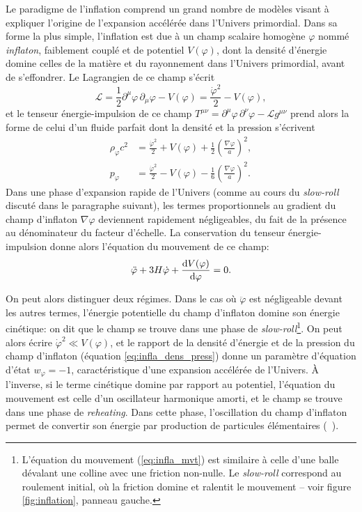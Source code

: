 Le paradigme de l'inflation comprend un grand nombre de modèles visant à expliquer l'origine de l'expansion accélérée dans l'Univers primordial.
Dans sa forme la plus simple, l'inflation est due à un champ scalaire homogène $\varphi$ nommé \textit{inflaton}, faiblement couplé et de potentiel $V(\varphi)$, dont la densité d'énergie domine celles de la matière et du rayonnement dans l'Univers primordial, avant de s'effondrer.
Le Lagrangien de ce champ s'écrit
\begin{equation}
    \mathcal{L} = \frac{1}{2} \partial^\mu\varphi \, \partial_\mu\varphi - V(\varphi) = \frac{\dot{\varphi}^2}{2} - V(\varphi),
\end{equation}
et le tenseur énergie-impulsion de ce champ $T^{\mu\nu} = \partial^\mu\varphi \, \partial^\nu\varphi - \mathcal{L}g^{\mu\nu}$ prend alors la forme de celui d'un fluide parfait dont la densité et la pression s'écrivent
\begin{align}
    \label{eq:infla_dens_press}
    \nonumber \rho_\varphi c^2 &= \frac{\dot{\varphi}^2}{2} + V(\varphi)
    + \frac{1}{2}\left(\frac{\nabla\varphi}{a}\right)^2, \\
    p_\varphi &= \frac{\dot{\varphi}^2}{2} - V(\varphi)
    - \frac{1}{6}\left(\frac{\nabla\varphi}{a}\right)^2.
\end{align}
Dans une phase d'expansion rapide de l'Univers (comme au cours du \textit{slow-roll} discuté dans le paragraphe suivant), les termes proportionnels au gradient du champ d'inflaton $\nabla\varphi$ deviennent rapidement négligeables, du fait de la présence au dénominateur du facteur d'échelle.
La conservation du tenseur énergie-impulsion donne alors l'équation du mouvement de ce champ:
\begin{equation}
    \label{eq:infla_mvt}
    \ddot{\varphi} + 3H\dot{\varphi} + \frac{\mathrm{d} V(\varphi)}{\mathrm{d}\varphi} = 0.
\end{equation}

On peut alors distinguer deux régimes.
Dans le cas où $\ddot{\varphi}$ est négligeable devant les autres termes, l'énergie potentielle du champ d'inflaton domine son énergie cinétique: on dit que le champ se trouve dans une phase de \textit{slow-roll}\footnote{L'équation du mouvement (\ref{eq:infla_mvt}) est similaire à celle d'une balle dévalant une colline avec une friction non-nulle. Le \textit{slow-roll} correspond au roulement initial, où la friction domine et ralentit le mouvement -- voir figure \ref{fig:inflation}, panneau gauche.}.
On peut alors écrire $\dot{\varphi}^2 \ll V(\varphi)$, et le rapport de la densité d'énergie et de la pression du champ d'inflaton (équation \ref{eq:infla_dens_press}) donne un paramètre d'équation d'état $w_\varphi = -1$, caractéristique d'une expansion accélérée de l'Univers.
À l'inverse, si le terme cinétique domine par rapport au potentiel, l'équation du mouvement est celle d'un oscillateur harmonique amorti, et le champ se trouve dans une phase de \textit{reheating}.
Dans cette phase, l'oscillation du champ d'inflaton permet de convertir son énergie par production de particules élémentaires (\eg\ \cite{abbott_particle_1982,albrecht_reheating_1982}).

